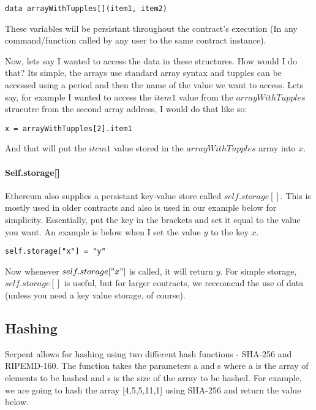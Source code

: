 \documentclass[12pt]{article}
\begin{document}
\begin{lstlisting}
data arrayWithTupples[](item1, item2)
\end{lstlisting}

These variables will be persistant throughout the contract's execution (In any command/function called by any user to the same contract instance).

Now, lets say I wanted to access the data in these structures. How would I do that? Its simple, the arrays use standard array syntax and tupples can be accessed using a period and then the name of the value we want to access. Lets say, for example I wanted to access the $item1$ value from the $arrayWithTupples$ strucutre from the second array address, I would do that like so:

\begin{lstlisting}
x = arrayWithTupples[2].item1
\end{lstlisting}

And that will put the $item1$ value stored in the $arrayWithTupples$ array into $x$. \cite{Serpent}

\paragraph{Self.storage[]}
Ethereum also supplies a persistant key-value store called $self.storage[]$. This is mostly used in older contracts and also is used in our example below for simplicity. Essentially, put the key in the brackets and set it equal to the value you want. An example is below when I set the value $y$ to the key $x$.

\begin{lstlisting}
self.storage["x"] = "y"
\end{lstlisting}

Now whenever $self.storage["x"]$ is called, it will return $y$. For simple storage, $self.storage[]$ is useful, but for larger contracts, we reccomend the use of data (unless you need a key value storage, of course). \cite{Serpent, Serpent 1.0 (old)}

\subsection{Hashing}
Serpent allows for hashing using two different hash functions - SHA-256 and RIPEMD-160. The function takes the parameters a and s where a is the array of elements to be hashed and s is the size of the array to be hashed. For example, we are going to hash the array [4,5,5,11,1] using SHA-256 and return the value below. \cite{Serpent}
\end{document}
